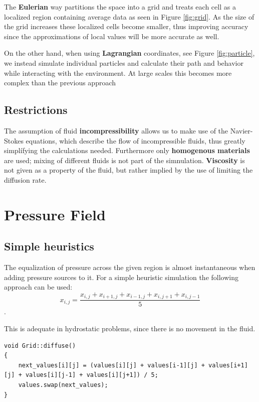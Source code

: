 \documentclass[12pt, titlepage]{article}
\begin{document}
\bigskip

The \textbf{Eulerian} way partitions the space into a grid and treats each cell as a localized region containing average data as seen in Figure \ref{fig:grid}. As the size of the grid increases these localized cells become smaller, thus improving accuracy since the approximations of local values will be more accurate as well.

\bigskip

On the other hand, when using \textbf{Lagrangian} coordinates, see Figure \ref{fig:particle}, we instead simulate individual particles and calculate their path and behavior while interacting with the environment.
At large scales this becomes more complex than the previous approach

\subsection{Restrictions}
The assumption of fluid \textbf{incompressibility} allows us to make use of the Navier-Stokes equations, which describe the flow of incompressible fluids, thus greatly simplífying the calculations needed.
Furthermore only \textbf{homogenous materials} are used; mixing of different fluids is not part of the simnulation.
\textbf{Viscosity} is not given as a property of the fluid, but rather implied by the use of limiting the diffusion rate.


\section{Pressure Field}

\subsection{Simple heuristics}

The equalization of pressure across the given region is almost instantaneous when adding pressure sources to it. For a simple heuristic simulation the following approach can be used:
\[ 
x_{i, j} = \frac{x_{i, j} + x_{i+1, j} + x_{i-1, j} + x_{i, j+1} + x_{i, j-1}}{5}
\].

\noindent This is adequate in hydrostatic problems, since there is no movement in the fluid.

\begin{lstlisting}
void Grid::diffuse()
{
	next_values[i][j] = (values[i][j] + values[i-1][j] + values[i+1][j] + values[i][j-1] + values[i][j+1]) / 5;
	values.swap(next_values);
}
\end{lstlisting}
\end{document}
